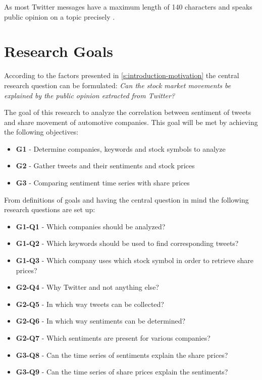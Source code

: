As most Twitter messages have a maximum length of 140 characters and speaks public opinion on a topic precisely
\cite{Pagolu2016a}.

\section{Research Goals}
\label{s:introduction-researchgoals}

According to the factors presented in \cref{s:introduction-motivation} the central research question can be formulated:
\emph{Can the stock market movements be explained by the public opinion extracted from Twitter?}

The goal of this research to analyze the correlation between sentiment of tweets and share movement of automotive companies.
This goal will be met by achieving the following objectives:

\begin{itemize}
    \item \textbf{G1} - Determine companies, keywords and stock symbols to analyze
    \item \textbf{G2} - Gather tweets and their sentiments and stock prices
    \item \textbf{G3} - Comparing sentiment time series with share prices
\end{itemize}

From definitions of goals and having the central question in mind the following research questions are set up:

\begin{itemize}
    \item \textbf{G1-Q1} - Which companies should be analyzed?
    \item \textbf{G1-Q2} - Which keywords should be used to find corresponding tweets?
    \item \textbf{G1-Q3} - Which company uses which stock symbol in order to retrieve share prices?
    \item \textbf{G2-Q4} - Why Twitter and not anything else?
    \item \textbf{G2-Q5} - In which way tweets can be collected?
    \item \textbf{G2-Q6} - In which way sentiments can be determined?
    \item \textbf{G2-Q7} - Which sentiments are present for various companies?
	\item \textbf{G3-Q8} - Can the time series of sentiments explain the share prices?
	\item \textbf{G3-Q9} - Can the time series of share prices explain the sentiments?
\end{itemize}

